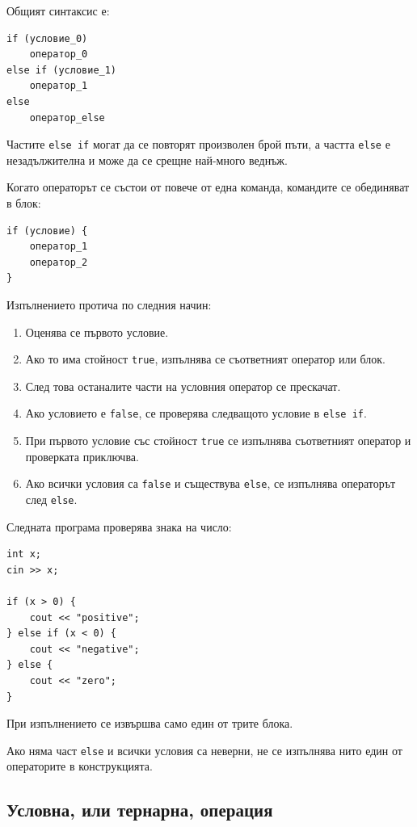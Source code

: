 Общият синтаксис е:

\begin{verbatim}
if (условие_0)
    оператор_0
else if (условие_1)
    оператор_1
else
    оператор_else
\end{verbatim}

Частите \texttt{else if} могат да се повторят произволен брой пъти, а частта \texttt{else} е незадължителна и може да се срещне най-много веднъж.

Когато операторът се състои от повече от една команда, командите се обединяват в блок:

\begin{verbatim}
if (условие) {
    оператор_1
    оператор_2
}
\end{verbatim}

Изпълнението протича по следния начин:

\begin{enumerate}
\item Оценява се първото условие.
\item Ако то има стойност \texttt{true}, изпълнява се съответният оператор или блок.
\item След това останалите части на условния оператор се прескачат.
\item Ако условието е \texttt{false}, се проверява следващото условие в \texttt{else if}.
\item При първото условие със стойност \texttt{true} се изпълнява съответният оператор и проверката приключва.
\item Ако всички условия са \texttt{false} и съществува \texttt{else}, се изпълнява операторът след \texttt{else}.
\end{enumerate}

\begin{example}
Следната програма проверява знака на число:

\begin{verbatim}
int x;
cin >> x;

if (x > 0) {
    cout << "positive";
} else if (x < 0) {
    cout << "negative";
} else {
    cout << "zero";
}
\end{verbatim}

При изпълнението се извършва само един от трите блока.
\end{example}

Ако няма част \texttt{else} и всички условия са неверни, не се изпълнява нито един от операторите в конструкцията.

\subsection{Условна, или тернарна, операция}\label{s:14.3.2}

